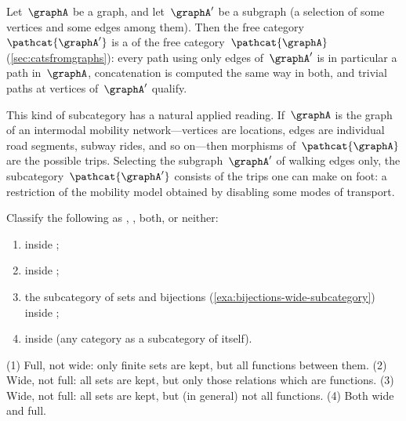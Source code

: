 \begin{example}
    \label{exa:subgraph-subcategory}
    Let~$\graphA$ be a graph, and let~$\graphA'$ be a subgraph (a selection of some vertices and some edges among them).
    Then the free category~$\pathcat{\graphA'}$ is a  of the free category~$\pathcat{\graphA}$ (\cref{sec:catsfromgraphs}): every path using only edges of~$\graphA'$ is in particular a path in~$\graphA$, concatenation is computed the same way in both, and trivial paths at vertices of~$\graphA'$ qualify.

    This kind of subcategory has a natural applied reading.
    If~$\graphA$ is the graph of an intermodal mobility network---vertices are locations, edges are individual road segments, subway rides, and so on---then morphisms of~$\pathcat{\graphA}$ are the possible trips.
    Selecting the subgraph~$\graphA'$ of walking edges only, the subcategory~$\pathcat{\graphA'}$ consists of the trips one can make on foot: a restriction of the mobility model obtained by disabling some modes of transport.
\end{example}

\begin{exercise}
    \label{ex:wide-full-classify}
    Classify the following  as , , both, or neither:
    \begin{enumerate}
        \item \FinSet inside \Set;
        \item \Set inside \Rel;
        \item the subcategory of sets and bijections (\cref{exa:bijections-wide-subcategory}) inside \Set;
        \item \CatC inside \CatC (any category as a subcategory of itself).
    \end{enumerate}
\end{exercise}
\begin{solution}
    (1) Full, not wide: only finite sets are kept, but all functions between them.
    (2) Wide, not full: all sets are kept, but only those relations which are functions.
    (3) Wide, not full: all sets are kept, but (in general) not all functions.
    (4) Both wide and full.
\end{solution}




